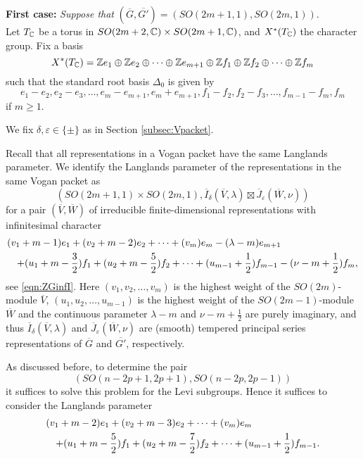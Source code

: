 \noindent
{\bf First case:}
\enspace 
{\it Suppose that } $(\overline{G},\overline{G'}) = (SO(2m+1,1), SO(2m,1))$.
\\
Let $T_{\mathbb C}$ be a torus in $SO(2m+2,{\mathbb C})  \times SO(2m+1,{\mathbb C})$, 
 and $X^{\ast}(T_{\mathbb C})$ the character group. 
Fix a basis 
\[
   X^*(T_{\mathbb{C}})
   = 
   {\mathbb Z} e_1\oplus {\mathbb Z} e_2 \oplus \dots \oplus {\mathbb Z} {{e_{m+1}}} \oplus {\mathbb Z} f_1\oplus {\mathbb Z} f_2 \oplus \dots \oplus {\mathbb Z} f_m  
\]
such that the standard root basis $\Delta_0$ is given by
\[
e_1-e_2, e_2-e_3,\dots,{{e_{m}-e_{m+1},e_{m}+e_{m+1}}}, f_1-f_2 ,f_2-f_3, \dots, f_{m-1}-f_m,f_m
\]
{if $m \ge 1$}. 

We fix $\delta, \varepsilon \in \{\pm\}$ as in Section \ref{subsec:Vpacket}.

Recall that all representations in a Vogan packet have
 the same Langlands parameter. 
We identify the Langlands parameter of the representations
 in the same Vogan packet as
\[
   (SO(2m+1,1)\times SO(2m,1), 
   \overline{I}_\delta(\overline{V}, \lambda) \boxtimes \overline{J}_\varepsilon(\overline{W},\nu))
\]
 for a pair $(\overline{V},\overline{W})$ of irreducible finite-dimensional representations with infinitesimal character
\begin{eqnarray*}
 \lefteqn{ ( v_1+m-1)e_1+(v_2+m-2)e_2
+ \dots 
+(v_m)e_m - (\lambda -m) e_{m+1}}
\\
&  & +(u_1+m-\frac 3 2 )f_1+
 (u_2+m- \frac 5 2 ) f_2 +\dots + (u_{m-1}+\frac 1 2)f_{m-1}
-(\nu - m+\frac 1 2 ) f_m, 
\end{eqnarray*}
see \eqref{eqn:ZGinfI}.  
Here $(v_1,v_2, \dots, v_m)$ is the highest weight
 of the $SO(2m)$-module $\overline{V}$,
 $(u_1,u_2,\dots, u_{m-1}) $ is the highest weight
 of the $SO(2m-1)$-module $\overline{W}$
 and the continuous parameter $\lambda-m$ and $\nu-m+\frac 12$
 are purely imaginary, 
 and thus $\overline I_{\delta}(\overline V, \lambda)$
 and $\overline J_{\varepsilon}(\overline W, \nu)$
 are (smooth) tempered principal series representations
 of $\overline G$ and $\overline{G'}$, 
 respectively.  



As discussed before, 
 to determine the pair 
\[
     (SO(n-2p+1,2p+1),SO(n-2p,2p-1))
\]
 it suffices to solve this problem for the Levi subgroups. 
Hence it suffices to  consider the Langlands parameter
\begin{eqnarray*}
 \lefteqn{ ( v_1+m-2)e_1+(v_2+m-3)e_2+ \dots +(v_m)e_m }\\
&  & +(u_1+m-\frac 5 2 )f_1+
 (u_2+m- \frac 7 2 ) f_2 +\dots + (u_{m-1} + \frac 12) f_{m-1} .
\end{eqnarray*}



